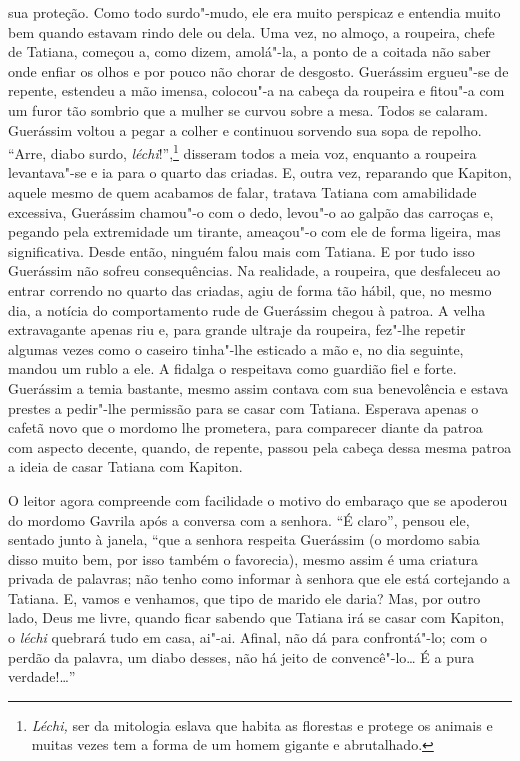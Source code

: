 sua proteção. Como todo surdo"-mudo, ele era muito perspicaz e entendia
muito bem quando estavam rindo dele ou dela. Uma vez, no almoço, a
roupeira, chefe de Tatiana, começou a, como dizem, amolá"-la, a ponto de
a coitada não saber onde enfiar os olhos e por pouco não chorar de
desgosto. Guerássim ergueu"-se de repente, estendeu a mão imensa,
colocou"-a na cabeça da roupeira e fitou"-a com um furor tão sombrio que
a mulher se curvou sobre a mesa. Todos se calaram. Guerássim voltou a
pegar a colher e continuou sorvendo sua sopa de repolho. ``Arre, diabo
surdo, \emph{léchi}!'',\footnote{\emph{Léchi,} ser da mitologia eslava
  que habita as florestas e protege os animais e muitas vezes tem a
  forma de um homem gigante e abrutalhado.} disseram todos a meia voz,
enquanto a roupeira levantava"-se e ia para o quarto das criadas. E,
outra vez, reparando que Kapiton, aquele mesmo de quem acabamos de
falar, tratava Tatiana com amabilidade excessiva, Guerássim chamou"-o com
o dedo, levou"-o ao galpão das carroças e, pegando pela extremidade um
tirante, ameaçou"-o com ele de forma ligeira, mas significativa. Desde
então, ninguém falou mais com Tatiana. E por tudo isso Guerássim não
sofreu consequências. Na realidade, a roupeira, que desfaleceu ao entrar
correndo no quarto das criadas, agiu de forma tão hábil, que, no mesmo
dia, a notícia do comportamento rude de Guerássim chegou à patroa. A
velha extravagante apenas riu e, para grande ultraje da roupeira,
fez"-lhe repetir algumas vezes como o caseiro tinha"-lhe esticado a mão e, no dia seguinte, mandou um rublo a ele. A fidalga o respeitava
como guardião fiel e forte. Guerássim a temia bastante, mesmo assim
contava com sua benevolência e estava prestes a pedir"-lhe permissão para
se casar com Tatiana. Esperava apenas o cafetã novo que o mordomo lhe
prometera, para comparecer diante da patroa com aspecto decente, quando,
de repente, passou pela cabeça dessa mesma patroa a ideia de casar
Tatiana com Kapiton.

O leitor agora compreende com facilidade o motivo do embaraço que se
apoderou do mordomo Gavrila após a conversa com a senhora. ``É claro'',
pensou ele, sentado junto à janela, ``que a senhora respeita Guerássim
(o mordomo sabia disso muito bem, por isso também o favorecia), mesmo
assim é uma criatura privada de palavras; não tenho como informar à
senhora que ele está cortejando a Tatiana. E, vamos e venhamos, que tipo
de marido ele daria? Mas, por outro lado, Deus me livre, quando ficar
sabendo que Tatiana irá se casar com Kapiton, o \emph{léchi} quebrará
tudo em casa, ai"-ai. Afinal, não dá para confrontá"-lo; com o perdão da
palavra, um diabo desses, não há jeito de convencê"-lo\ldots{} É a pura
verdade!\ldots{}''

